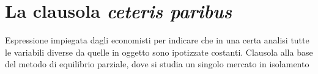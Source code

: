 \documentclass{report}
\begin{document}
	\section{La clausola \textit{ceteris paribus}}
	Espressione impiegata dagli economisti per indicare che in una certa analisi tutte le variabili diverse da quelle in oggetto sono ipotizzate costanti. Clausola alla base del metodo di equilibrio parziale, dove si studia un singolo mercato in isolamento
\end{document}
